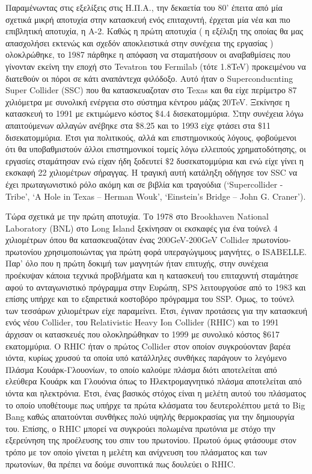 	Παραμένωντας στις εξελίξεις στις Η.Π.Α., την δεκαετία του 80’ έπειτα από μία σχετικά μικρή αποτυχία στην κατασκευή ενός επιταχυντή, έρχεται μία νέα και πιο επιβλητική αποτυχία, η Α-2. Καθώς η πρώτη αποτυχία ( η εξέλιξη της οποίας θα μας απασχολήσει εκτενώς και σχεδόν αποκλειστικά στην συνέχεια της εργασίας ) ολοκλρώθηκε, το 1987 πάρθηκε η απόφαση να σταματήσουν οι αναβαθμίσεις που γίνονταν εκείνη την εποχή στο Tevatron του Fermilab (τότε 1.8TeV) προκειμένου να διατεθούν οι πόροι σε κάτι αναπάντεχα φιλόδοξο. Αυτό ήταν ο Superconducnting Super Collider (SSC) που θα κατασκευαζοταν στο Texas και θα είχε περίμετρο 87 χιλιόμετρα με συνολική ενέργεια στο σύστημα κέντρου μάζας 20TeV. Ξεκίνησε η κατασκευή το 1991 με εκτιμώμενο κόστος $\$4.4$ δισεκατομμύρια. 
	Στην συνέχεια λόγω απαιτούμενων αλλαγών ανέβηκε στα \$8.25 και το 1993 είχε φτάσει στα $\$$11 δισεκατομμύρια. Έτσι για πολιτικούς, αλλά και επιστημονικούς λόγους, φοβούμενοι ότι θα υποβαθμιστούν άλλοι επιστημονικοί τομείς λόγω ελλειπούς χρηματοδότησης, οι εργασίες σταμάτησαν ενώ είχαν ήδη ξοδευτεί $\$2$ δυσεκατομμύρια και ενώ είχε γίνει η εκσκαφή 22 χιλιομέτρων σήραγγας. 
	Η τραγική αυτή κατάληξη  οδήγησε τον SSC να έχει πρωταγωνιστικό ρόλο ακόμη και σε βιβλία και τραγούδια (‘Supercollider - Tribe’, ‘A Hole in Texas – Herman Wouk’, ‘Einstein’s Bridge – John G. Craner’).
	
	Τώρα σχετικά με την πρώτη αποτυχία. Το 1978 στο Brookhaven National Laboratory (BNL) στο Long Island ξεκίνησαν οι εκσκαφές για ένα τούνελ 4 χιλιομέτρων όπου θα κατασκευαζόταν ένας 200GeV-200GeV Collider πρωτονίου-πρωτονίου χρησιμοποιώντας για πρώτη φορά υπεραγώγιμους μαγνήτες, ο ISABELLE. 
	Παρ’ όλο που η πρώτη δοκιμή των μαγνητών ήταν επιτυχής, στην συνέχεια προέκυψαν κάποια τεχνικά προβλήματα και η κατασκευή του επιταχυντή σταμάτησε αφού το ανταγωνιστικό πρόγραμμα στην Ευρώπη, SPS λειτουργούσε από το 1983 και επίσης υπήρχε και το εξαιρετικά κοστοβόρο πρόγραμμα του SSP. 
	Όμως, το τούνελ των τεσσάρων χιλιομέτρων είχε παραμείνει. Έτσι, έγιναν προτάσεις για την κατασκευή ενός νέου Collider, του Relativistic Heavy Ion Collider (RHIC) και το 1991 άρχισαν οι κατασκευές που ολοκληρώθηκαν το 1999 με συνολικό κόστος \$617 εκατομμύρια. 
Ο RHIC ήταν ο πρώτος Collider στον οποίον συγκρούονταν βαρέα ιόντα, κυρίως χρυσού τα οποία υπό κατάλληλες συνθήκες παράγουν το λεγόμενο Πλάσμα Κουάρκ-Γλουονίων, το οποίο καλούμε πλάσμα διότι αποτελείται από ελεύθερα Κουάρκ και Γλουόνια όπως το Ηλεκτρομαγνητικό πλάσμα αποτελείται από ιόντα και ηλεκτρόνια. 
Έτσι, ένας βασικός στόχος είναι η μελέτη αυτού του πλάσματος το οποίο υποθέτουμε πως υπήρχε τα πρώτα κλάσματα του δευτερολέπτου μετά το Big Bang καθώς απαιτούνται συνθήκες πολύ υψηλής θερμοκρασίας για την δημιουργία του. Επίσης, ο RHIC μπορεί να συγκρούει πολωμένα πρωτόνια με στόχο την εξερεύνηση της προέλευσης του σπιν του πρωτονίου.  Πρωτού όμως φτάσουμε στον τρόπο με τον οποίο γίνεται η μελέτη και ανίχνευση του πλάσματος και των πρωτονίων, θα πρέπει να δούμε συνοπτικά πως δουλεύει ο RHIC.
